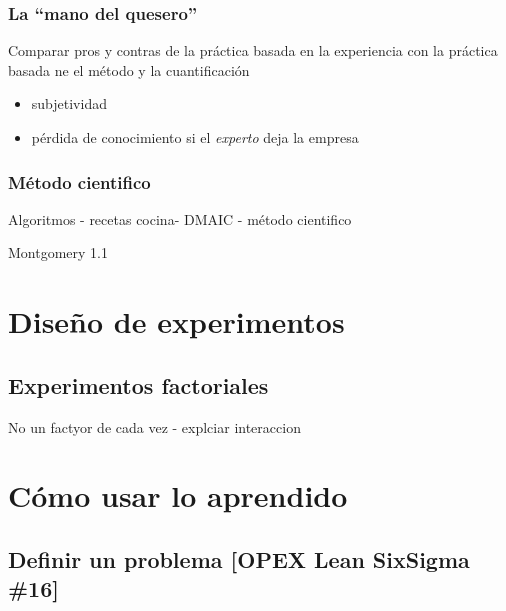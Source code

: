 \documentclass[
  letterpaper,
]{scrbook}
\providecommand{\tightlist}{%
  \setlength{\itemsep}{0pt}\setlength{\parskip}{0pt}}\usepackage{longtable,booktabs,array}
\begin{document}
\hypertarget{la-mano-del-quesero}{%
\subsection{La ``mano del quesero''}\label{la-mano-del-quesero}}

Comparar pros y contras de la práctica basada en la experiencia con la
práctica basada ne el método y la cuantificación

\begin{itemize}
\tightlist
\item
  subjetividad
\item
  pérdida de conocimiento si el \emph{experto} deja la empresa
\end{itemize}

\hypertarget{muxe9todo-cientifico}{%
\subsection{Método cientifico}\label{muxe9todo-cientifico}}

Algoritmos - recetas cocina- DMAIC - método cientifico

Montgomery 1.1


\hypertarget{diseuxf1o-de-experimentos}{%
\chapter{Diseño de experimentos}\label{diseuxf1o-de-experimentos}}

\hypertarget{experimentos-factoriales}{%
\section{Experimentos factoriales}\label{experimentos-factoriales}}

No un factyor de cada vez - explciar interaccion


\hypertarget{cuxf3mo-usar-lo-aprendido}{%
\chapter{Cómo usar lo aprendido}\label{cuxf3mo-usar-lo-aprendido}}

\hypertarget{definir-un-problema-opex-lean-sixsigma-16}{%
\section{Definir un problema {[}OPEX Lean SixSigma
\#16{]}}\label{definir-un-problema-opex-lean-sixsigma-16}}
\end{document}
